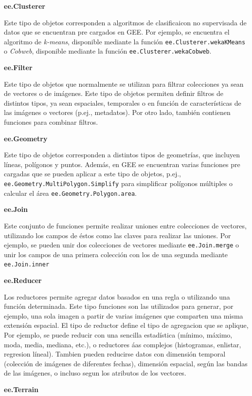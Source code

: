 \documentclass[
]{article}
\begin{document}
\textbf{ee.Clusterer}

Este tipo de objetos corresponden a algoritmos de clasificaicon no
supervisada de datos que se encuentran pre cargados en GEE. Por ejemplo,
se encuentra el algoritmo de \emph{k-means}, disponible mediante la
función \texttt{ee.Clusterer.wekaKMeans} o \emph{Cobweb}, disponible
mediante la función \texttt{ee.Clusterer.wekaCobweb}.

\textbf{ee.Filter}

Este tipo de objetos que normalmente se utilizan para filtrar
colecciones ya sean de vectores o de imágenes. Este tipo de objetos
permiten definir filtros de distintos tipos, ya sean espaciales,
temporales o en función de características de las imágenes o vectores
(p.ej., metadatos). Por otro lado, también contienen funciones para
combinar filtros.

\textbf{ee.Geometry}

Este tipo de objetos corresponden a distintos tipos de geometrías, que
incluyen líneas, polígonos y puntos. Además, en GEE se encuentran varias
funciones pre cargadas que se pueden aplicar a este tipo de objetos,
p.ej., \texttt{ee.Geometry.MultiPolygon.Simplify} para simplificar
polígonos múltiples o calcular el área
\texttt{ee.Geometry.Polygon.area}.

\textbf{ee.Join}

Este conjunto de funciones permite realizar uniones entre colecciones de
vectores, utilizando los campos de éstos como las claves para realizar
las uniones. Por ejemplo, se pueden unir dos colecciones de vectores
mediante \texttt{ee.Join.merge} o unir los campos de una primera
colección con los de una segunda mediante \texttt{ee.Join.inner}

\textbf{ee.Reducer}

Los reductores permite agregar datos basados en una regla o utilizando
una función determinada. Este tipo funciones son las utilizados para
generar, por ejemplo, una sola imagen a partir de varias imágenes que
comparten una misma extensión espacial. El tipo de reductor define el
tipo de agregacion que se aplique, Por ejemplo, se puede reducir con una
sencilla estadística (mínimo, máximo, moda, media, mediana, etc.), o
reductores áas complejos (histogramas, enlistar, regresion líneal).
Tambien pueden reducirse datos con dimensión temporal (colección de
imágenes de diferentes fechas), dimensión espacial, según las bandas de
las imágenes, o incluso segun los atributos de los vectores.

\textbf{ee.Terrain}
\end{document}
